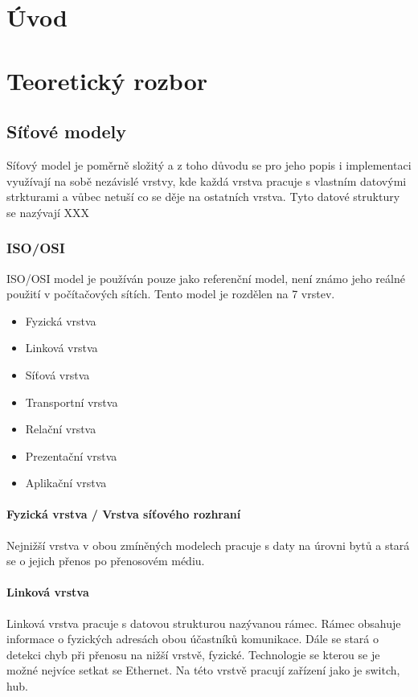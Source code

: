 
\chapter{Úvod}

\chapter{Teoretický rozbor}
\section{Síťové modely}

Síťový model je poměrně složitý a z toho důvodu se pro jeho popis i implementaci využívají na sobě nezávislé vrstvy, kde každá vrstva pracuje s vlastním datovými strkturami a vůbec netuší co se děje na ostatních vrstva.
Tyto datové struktury se nazývají XXX


\subsection{ISO/OSI}
ISO/OSI model je používán pouze jako referenční model, není známo jeho reálné použití v počítačových sítích.
Tento model je rozdělen na 7 vrstev.

\begin{itemize}
\item{Fyzická vrstva}
\item{Linková vrstva}
\item{Síťová vrstva}
\item{Transportní vrstva}
\item{Relační vrstva}
\item{Prezentační vrstva}
\item{Aplikační vrstva}
\end{itemize}

\subsubsection{Fyzická vrstva / Vrstva síťového rozhraní}
Nejnižší vrstva v obou zmíněných modelech pracuje s daty na úrovni bytů a stará se o jejich přenos po přenosovém médiu.

\subsubsection{Linková vrstva}
Linková vrstva pracuje s datovou strukturou nazývanou rámec.
Rámec obsahuje informace o fyzických adresách obou účastníků komunikace.
Dále se stará o detekci chyb při přenosu na nižší vrstvě, fyzické.
Technologie se kterou se je možné nejvíce setkat se Ethernet.
Na této vrstvě pracují zařízení jako je switch, hub.

